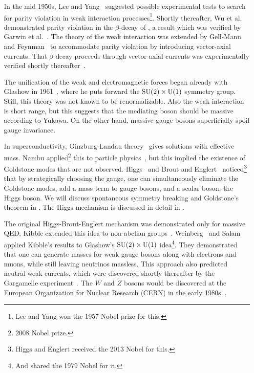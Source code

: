In the mid 1950s, Lee and Yang~\cite{lee_question_1956} suggested possible
experimental tests to search for parity violation in weak interaction 
processes\footnote{Lee and Yang won the 1957 Nobel prize for this.}.
Shortly thereafter, Wu et al.~\cite{wu_experimental_1957} demonstrated parity
violation in the $\beta$-decay of ,
a result which was verified by Garwin et al.~\cite{garwin_observations_1957}. 
The theory of the weak interaction was extended by Gell-Mann and
Feynman~\cite{feynman_theory_1958} to accommodate parity violation by
introducing vector-axial currents.
That $\beta$-decay proceeds through vector-axial currents was
experimentally verified shortly thereafter~\cite{goldhaber_helicity_1958}.

The unification of the weak and electromagnetic forces began already with
Glashow in 1961~\cite{glashow_partial-symmetries_1961}, where
he puts forward the $\operatorname{SU}(2)\times \operatorname{U}(1)$ symmetry group. 
Still, this theory was not known to be renormalizable.
Also the weak interaction is short range, but this suggests that the mediating boson 
should be massive according to Yukawa. On the other hand, 
massive gauge bosons superficially spoil gauge invariance.

In superconductivity, Ginzburg-Landau theory~\cite{ginzburg_theory_1950}
gives solutions with effective mass. Nambu applied\footnote{2008 Nobel prize.} 
this to particle
physics~\cite{nambu_axial_1960,nambu_dynamical_1961,nambu_dynamical_1961-1},
but this implied the existence of Goldstone modes that are not observed.
Higgs~\cite{higgs_broken_1964} and Brout and Englert~\cite{englert_broken_1964}
noticed\footnote{Higgs and Englert received the 2013 Nobel for this.} 
that by strategically choosing 
the gauge, one can simultaneously
eliminate the Goldstone modes, add a mass term to gauge bosons, and a scalar
boson, the Higgs boson.
We will discuss spontaneous symmetry breaking and Goldstone's theorem
 in . The Higgs
mechanism is discussed in detail in .

The original Higgs-Brout-Englert mechanism was demonstrated only for massive
QED; Kibble extended this idea to non-abelian
groups~\cite{kibble_symmetry_1967}. Weinberg~\cite{weinberg_model_1967}
and Salam~\cite{salam_weak_1968} applied Kibble's results to Glashow's
$\operatorname{SU}(2)\times\operatorname{U}(1)$ idea\footnote{And shared the 1979 Nobel for it.}. 
They demonstrated that one can generate masses
for weak gauge bosons along with electrons and muons, while still leaving
neutrinos massless. This approach also predicted neutral weak currents,
which were discovered shortly thereafter by the Gargamelle
experiment~\cite{hasert_observation_1974}. The $W$ and $Z$ bosons would
be discovered at the European Organization for Nuclear Research (CERN)
in the early 1980s~\cite{aubert_ratio_1983,arnison_experimental_1983}.


